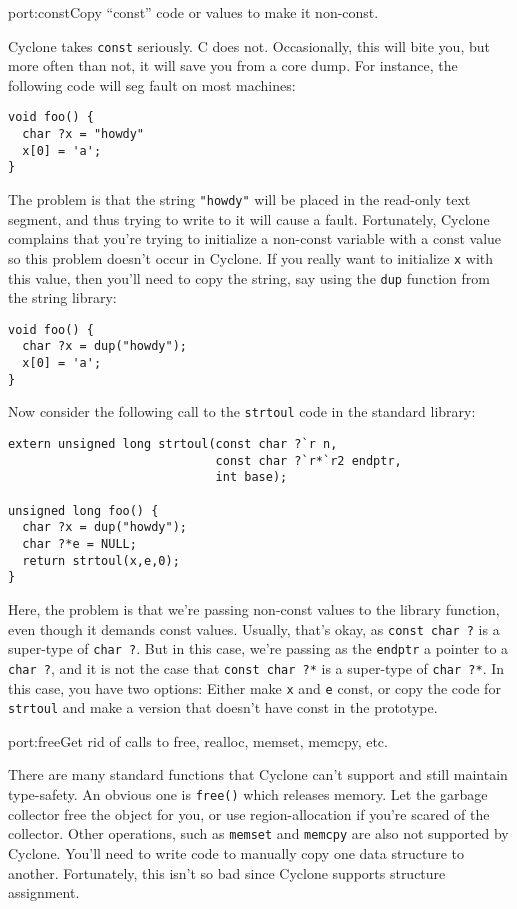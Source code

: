 \begin{porta}{port:const}{Copy ``const'' code or values to make it non-const.}  

Cyclone takes \texttt{const} seriously.  C does not.  Occasionally,
this will bite you, but more often than not, it will save you from
a core dump.  For instance, the following code will seg fault on
most machines:
\begin{verbatim}
void foo() {
  char ?x = "howdy"
  x[0] = 'a';
}
\end{verbatim}
The problem is that the string \texttt{"howdy"} will be placed in
the read-only text segment, and thus trying to write to it will
cause a fault.  Fortunately, Cyclone complains that you're trying
to initialize a non-const variable with a const value so this
problem doesn't occur in Cyclone.  If you really want to initialize
\texttt{x} with this value, then you'll need to copy the string,
say using the \texttt{dup} function from the string library:
\begin{verbatim}
void foo() {
  char ?x = dup("howdy");
  x[0] = 'a';
}
\end{verbatim}
Now consider the following
call to the \texttt{strtoul} code in the standard library:
\begin{verbatim}
extern unsigned long strtoul(const char ?`r n, 
                             const char ?`r*`r2 endptr,
                             int base);

unsigned long foo() {
  char ?x = dup("howdy");
  char ?*e = NULL;
  return strtoul(x,e,0);
}
\end{verbatim}
Here, the problem is that we're passing non-const values to the
library function, even though it demands const values.  Usually,
that's okay, as \texttt{const char ?} is a super-type of
\texttt{char ?}.  But in this case, we're passing as the
\texttt{endptr} a pointer to a \texttt{char ?}, and it
is not the case that \texttt{const char ?*} is a super-type
of \texttt{char ?*}.  In this case, you have two options:
Either make \texttt{x} and \texttt{e} const, or copy the
code for \texttt{strtoul} and make a version that doesn't
have const in the prototype.  
\end{porta}

\begin{porta}{port:free}{Get rid of calls to free, realloc, memset, memcpy, etc.}

There are many standard functions that Cyclone can't support 
and still maintain type-safety.  An obvious one is \texttt{free()}
which releases memory.  Let the garbage collector free the object
for you, or use region-allocation if you're scared of the collector.
Other operations, such as \texttt{memset} and \texttt{memcpy} 
are also not supported
by Cyclone. You'll need to write code to manually copy one data
structure to another.  Fortunately, this isn't so bad since Cyclone
supports structure assignment.  
\end{porta}

